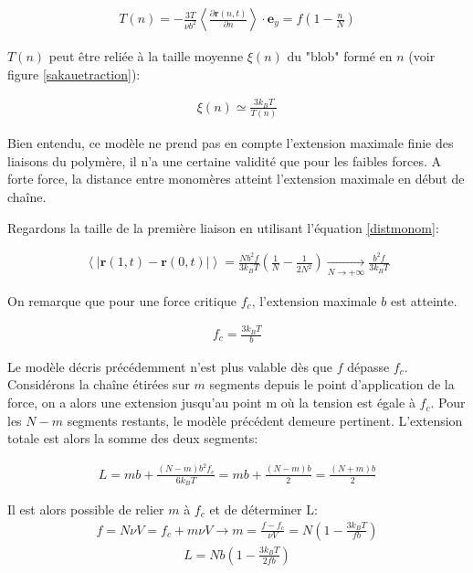 \begin{eqnarray}
T(n) = -\frac{3T}{\nu b^2}\left<\frac{\partial  \textbf{r}(n,t)}{\partial  n}\right> \cdot \textbf{e}_{y} = f \left(1-\frac{n}{N}\right)
\end{eqnarray}

$T(n)$ peut être reliée à la taille moyenne $\xi(n)$ du "blob" formé en $n$ (voir figure \ref{sakauetraction}):

\begin{eqnarray}
\xi(n) \simeq \frac{3k_BT}{T(n)}
\end{eqnarray}


Bien entendu, ce modèle ne prend pas en compte l'extension maximale finie des liaisons du polymère, il n'a une certaine validité que pour les faibles forces. A forte force, la distance entre monomères atteint l'extension maximale en début de chaîne.

Regardons la taille de la première liaison en utilisant l'équation \ref{distmonom}:

\begin{eqnarray}
\left<|\mathbf{r}(1,t)-\mathbf{r}(0,t)|\right> = \frac{Nb^2f}{3k_BT} \left(\frac{1}{N}-\frac{1}{2N^2} \right) \underset{N\to+\infty}{\longrightarrow} \frac{b^2f}{3k_BT}
\end{eqnarray} 

On remarque que pour une force critique $f_c$, l'extension maximale $b$ est atteinte.

\begin{eqnarray}
f_c=\frac{3k_BT}{b} 
\end{eqnarray} 

Le modèle décris précédemment n'est plus valable dès que $f$ dépasse $f_c$. Considérons la chaîne étirées sur $m$ segments depuis le point d'application de la force, on a alors une extension jusqu'au point m où la tension est égale à $f_c$. Pour les $N-m$ segments restants, le modèle précédent demeure pertinent.
L'extension totale est alors la somme des deux segments:

\begin{eqnarray}
L=  m b + \frac{(N-m)b^2f_c}{6k_BT} = mb + \frac{(N-m)b}{2} = \frac{(N+m)b}{2}
\end{eqnarray}

Il est alors possible de relier $m$ à $f_c$ et de déterminer L:
\begin{eqnarray}
f=  N\nu V = f_c + m\nu V \rightarrow m= \frac{f-f_c}{\nu V} = N\left(1-\frac{3k_BT}{fb}\right)
\end{eqnarray}
\begin{eqnarray}
L= Nb\left(1-\frac{3k_BT}{2
fb}\right)
\end{eqnarray}



